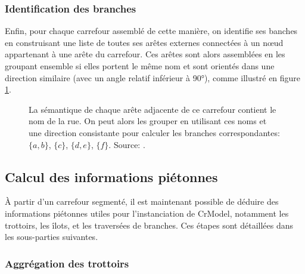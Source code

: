 \subsubsection{Identification des branches}

\newpar{}

Enfin, pour chaque carrefour assemblé de cette manière, on identifie ses banches en construisant une liste de toutes ses arêtes externes connectées à un nœud appartenant à une arête du carrefour. Ces arêtes sont alors assemblées en les groupant ensemble si elles portent le même nom et sont orientés dans une direction similaire (avec un angle relatif inférieur à 90°), comme illustré en figure \ref{fig:modelisation_mergeBranches}.

\begin{figure}
    \centering
    \caption{La sémantique de chaque arête adjacente de ce carrefour contient le nom de la rue. On peut alors les grouper en utilisant ces noms et une direction consistante pour calculer les branches correspondantes: $\{a, b\}$, $\{c\}$, $\{d, e\}$, $\{f\}$. Source: \cite{Favreau2022}.}
    \label{fig:modelisation_mergeBranches}
\end{figure}

\subsection{Calcul des informations piétonnes}

À partir d'un carrefour segmenté, il est maintenant possible de déduire des informations piétonnes utiles pour l'instanciation de CrModel, notamment les trottoirs, les îlots, et les traversées de branches. Ces étapes sont détaillées dans les sous-parties suivantes.

\subsubsection{Aggrégation des trottoirs}

